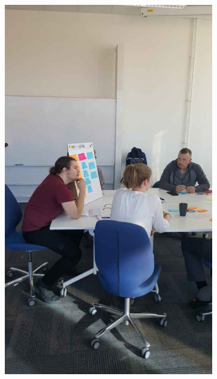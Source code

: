 \begin{figure}[hb]
\begin{subfigure}{.32\textwidth}
        \includegraphics[width=\textwidth, angle=270, origin=c]{img/workshop2_resized.jpg}
        \label{fig:workshop2}
    \end{subfigure}
    \begin{subfigure}{.32\textwidth}
        \centering

\end{subfigure}
\end{figure}
